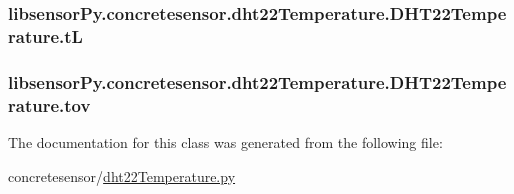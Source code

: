 \subsubsection[{t\+L}]{\setlength{\rightskip}{0pt plus 5cm}libsensor\+Py.\+concretesensor.\+dht22\+Temperature.\+D\+H\+T22\+Temperature.\+t\+L}\label{classlibsensorPy_1_1concretesensor_1_1dht22Temperature_1_1DHT22Temperature_ae9528cd4be0fa3526f2aa9a78196d6aa}
\hypertarget{classlibsensorPy_1_1concretesensor_1_1dht22Temperature_1_1DHT22Temperature_ad2ccf4c8765b3457f3bab47bd52f031a}{}
\subsubsection[{tov}]{\setlength{\rightskip}{0pt plus 5cm}libsensor\+Py.\+concretesensor.\+dht22\+Temperature.\+D\+H\+T22\+Temperature.\+tov}\label{classlibsensorPy_1_1concretesensor_1_1dht22Temperature_1_1DHT22Temperature_ad2ccf4c8765b3457f3bab47bd52f031a}


The documentation for this class was generated from the following file\+:\begin{DoxyCompactItemize}
\item 
concretesensor/\hyperlink{concretesensor_2dht22Temperature_8py}{dht22\+Temperature.\+py}\end{DoxyCompactItemize}

